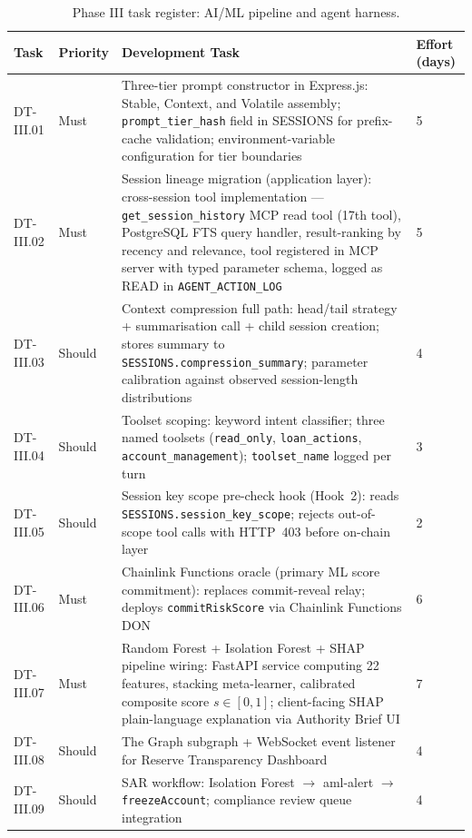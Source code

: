 \documentclass[12pt,a4paper]{report}
\begin{document}
\begin{table}[H]
\centering
\caption{Phase III task register: AI/ML pipeline and agent harness.}
\label{tab:phaseIII}
\small
\begin{tabular}{p{1.8cm}p{1.8cm}p{7.5cm}p{1.5cm}}
\hline
\textbf{Task} & \textbf{Priority} & \textbf{Development Task} & \textbf{Effort (days)} \\
\hline
DT-III.01 & Must & Three-tier prompt constructor in Express.js: Stable, Context, and Volatile assembly; \texttt{prompt\_tier\_hash} field in SESSIONS for prefix-cache validation; environment-variable configuration for tier boundaries & 5 \\
\hline
DT-III.02 & Must & Session lineage migration (application layer): cross-session tool implementation --- \texttt{get\_session\_history} MCP read tool (17th tool), PostgreSQL FTS query handler, result-ranking by recency and relevance, tool registered in MCP server with typed parameter schema, logged as READ in \texttt{AGENT\_ACTION\_LOG} & 5 \\
\hline
DT-III.03 & Should & Context compression full path: head/tail strategy + summarisation call + child session creation; stores summary to \texttt{SESSIONS.compression\_summary}; parameter calibration against observed session-length distributions & 4 \\
\hline
DT-III.04 & Should & Toolset scoping: keyword intent classifier; three named toolsets (\texttt{read\_only}, \texttt{loan\_actions}, \texttt{account\_management}); \texttt{toolset\_name} logged per turn & 3 \\
\hline
DT-III.05 & Should & Session key scope pre-check hook (Hook~2): reads \texttt{SESSIONS.session\_key\_scope}; rejects out-of-scope tool calls with HTTP~403 before on-chain layer & 2 \\
\hline
DT-III.06 & Must & Chainlink Functions oracle (primary ML score commitment): replaces commit-reveal relay; deploys \texttt{commitRiskScore} via Chainlink Functions DON & 6 \\
\hline
DT-III.07 & Must & Random Forest + Isolation Forest + SHAP pipeline wiring: FastAPI service computing 22 features, stacking meta-learner, calibrated composite score $s \in [0,1]$; client-facing SHAP plain-language explanation via Authority Brief UI & 7 \\
\hline
DT-III.08 & Should & The Graph subgraph + WebSocket event listener for Reserve Transparency Dashboard & 4 \\
\hline
DT-III.09 & Should & SAR workflow: Isolation Forest $\to$ aml-alert $\to$ \texttt{freezeAccount}; compliance review queue integration & 4 \\

\end{tabular}
\end{table}
\end{document}
